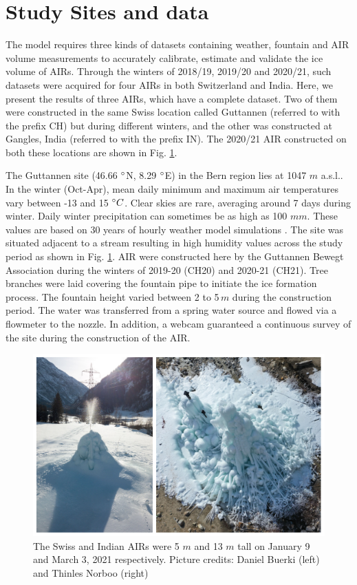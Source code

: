 \documentclass[utf8]{frontiersSCNS}
\begin{document}
\section{Study Sites and data}

The model requires three kinds of datasets containing weather, fountain and AIR volume measurements to
accurately calibrate, estimate and validate the ice volume of AIRs. Through the winters of 2018/19, 2019/20 and
2020/21, such datasets were acquired for four AIRs in both Switzerland and India. Here, we present the results of
three AIRs, which have a complete dataset. Two of them were constructed in the same Swiss location called
Guttannen (referred to with the prefix CH) but during different winters, and the other was constructed at
Gangles, India (referred to with the prefix IN). The 2020/21 AIR constructed on both these locations are shown
in Fig. \ref{fig:2AIR}.

The Guttannen site (46.66 $\degree$N, 8.29 $\degree$E) in the Bern region lies at 1047 $m$ a.s.l.. In the winter
(Oct-Apr), mean daily minimum and maximum air temperatures vary between -13 and 15 $\degree C$. Clear skies are
rare, averaging around 7 days during winter. Daily winter precipitation can sometimes be as high as 100 $mm$.
These values are based on 30 years of hourly weather model simulations \citep{guttannen}. The site was situated
adjacent to a stream resulting in high humidity values across the study period as shown in Fig. \ref{fig:2AIR}.
AIR were constructed here by the Guttannen Bewegt Association during the winters of 2019-20 (CH20) and 2020-21
(CH21). Tree branches were laid covering the fountain pipe to initiate the ice formation process. The fountain
height varied between 2 to 5\,$m$ during the construction period. The water was transferred from a spring water
source and flowed via a flowmeter to the nozzle. In addition, a webcam guaranteed a continuous survey of the
site during the construction of the AIR.

\begin{figure}
	\begin{center}
		\includegraphics[width=12 cm]{Figures/Figure_2.jpg}
	\end{center}
  \caption{The Swiss and Indian AIRs were 5 $m$ and 13 $m$ tall on January 9 and March 3, 2021 respectively. Picture
credits: Daniel Buerki (left) and Thinles Norboo (right)} \label{fig:2AIR} \end{figure}
\end{document}
